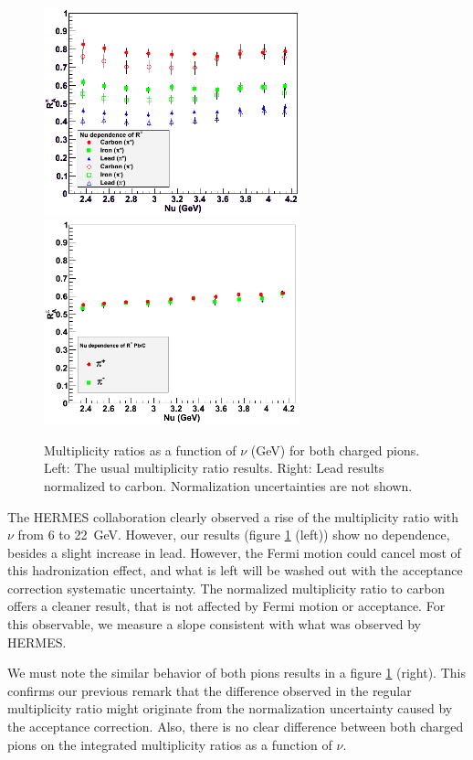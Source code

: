 \begin{figure}[tbp]
\centering
\includegraphics[width=7.4cm] {chap6-fig/F_RvNu.png} 
\includegraphics[width=7.4cm] {chap6-fig/F_RvNu_PbC.png} 
\caption{Multiplicity ratios as a function of $\nu$ (GeV) for both charged pions. Left: The usual multiplicity ratio results. Right: Lead results normalized to carbon. Normalization uncertainties are not shown.}
\label{fig:RNu}
\end{figure}

The HERMES collaboration clearly observed a rise of the multiplicity ratio 
with $\nu$ from 6 to 22~GeV. However, our results (figure \ref{fig:RNu} (left))
show no dependence, besides a slight increase in lead.
However, the Fermi motion could cancel most of this hadronization effect, and 
what is left will be washed out with the acceptance correction systematic 
uncertainty. The normalized multiplicity ratio to carbon offers a 
cleaner result, that is not affected by Fermi motion or acceptance. For this
observable, we measure a slope consistent with what was observed by HERMES.

We must note the similar behavior of both pions results in a figure 
\ref{fig:RNu} (right). This confirms our previous remark that the difference 
observed in the regular multiplicity ratio might originate from the 
normalization uncertainty caused by the acceptance correction. Also, there is no 
clear difference between both charged pions on the integrated multiplicity 
ratios as a function of $\nu$.

